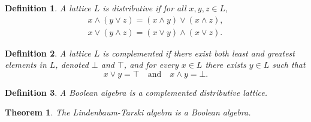 \documentclass[titlepage]{article}
\newtheorem{theorem}{Theorem}[section]
\newtheorem{definition}{Definition}[section]
\begin{document}
\begin{definition}
    A lattice $L$ is distributive if for all $x,y,z \in L$,
    \begin{align*}
        x \wedge (y \vee z) = (x \wedge y) \vee (x \wedge z), \\
        x \vee (y \wedge z) = (x \vee y) \wedge (x \vee z).
    \end{align*}
\end{definition}

\begin{definition}
    A lattice $L$ is complemented if there exist both least and greatest elements in $L$, denoted $\bot$ and $\top$, and for every $x\in L$ there exists $y\in L$ such that
    $$x \vee y = \top \quad \text{and} \quad x\wedge y = \bot.$$
\end{definition}

\begin{definition}
    A Boolean algebra is a complemented distributive lattice.
\end{definition}

\begin{theorem}
    The Lindenbaum-Tarski algebra is a Boolean algebra.
\end{theorem}
\end{document}
